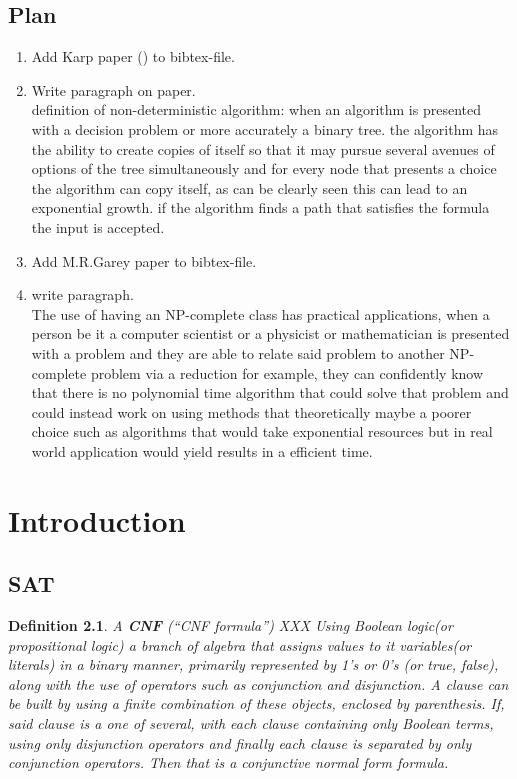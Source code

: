 \documentclass[a4paper]{report}
\newtheorem{defi}{Definition}[section]
\begin{document}
\section{Plan}
\label{sec:Plan}

\begin{enumerate}
\item Add Karp paper (\cite{Karp1972NP}) to bibtex-file.
\item Write paragraph on paper.\\
definition of non-deterministic algorithm: when an algorithm is presented with a decision problem or more accurately a binary tree. the algorithm has the ability to create copies of itself so that it may pursue several avenues of options of the tree simultaneously and for every node that presents a choice the algorithm can copy itself, as can be clearly seen this can lead to an exponential growth. if the algorithm finds a path that satisfies the formula the input is accepted. \cite{Karp1972NP}
\item Add M.R.Garey paper \cite{MRGarey1976} to bibtex-file.
\item write paragraph.\\
The use of having an NP-complete class has practical applications, when a person be it a computer scientist or a physicist or mathematician is presented with a problem and they are able to relate said problem to another NP-complete problem via a reduction for example, they can confidently know that there is no polynomial time algorithm that could solve that problem and could instead work on using methods that theoretically maybe a poorer choice such as algorithms that would take exponential resources but in real world application would yield results in a efficient time.\cite{MRGarey1976}

\end{enumerate}



\chapter{Introduction}
\label{cha:Introduction}

\section{SAT}
\label{sec:BackgroundSAT}

\begin{defi}\label{def:CNF}
  A \textbf{CNF} (``CNF formula'')  XXX Using Boolean logic(or propositional logic) a branch of algebra that assigns values to it variables(or literals) in a binary manner, primarily represented by 1's or 0's (or true, false), along with the use of operators such as conjunction and disjunction. A clause can be built by using a finite combination of these objects, enclosed by parenthesis. If, said clause is a one of several, with each clause containing only Boolean terms, using only disjunction operators and finally each clause is separated by only conjunction operators. Then that is a conjunctive normal form formula.
\end{defi}
\end{document}
